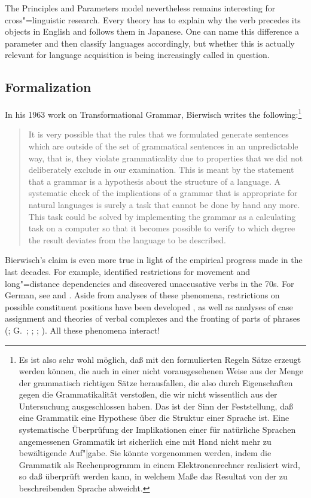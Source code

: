 The Principles and Parameters model nevertheless remains interesting for cross"=linguistic
research. Every theory has to explain why the verb precedes its objects in English and follows them in 
Japanese. One can name this difference a parameter and then classify languages
accordingly, but whether this is actually relevant for language acquisition is being increasingly called in question.

\subsection{Formalization}
\label{sec-formalization-gb}

In his 1963 work on Transformational Grammar, Bierwisch writes the following:\footnote{
Es ist also sehr wohl möglich, daß mit den formulierten Regeln Sätze erzeugt werden können,
die auch in einer nicht vorausgesehenen Weise aus der Menge der grammatisch richtigen Sätze herausfallen,
die also durch Eigenschaften gegen die Grammatikalität verstoßen, die wir nicht wissentlich aus
der Untersuchung ausgeschlossen haben. Das ist der Sinn der Feststellung, daß eine Grammatik
eine Hypothese über die Struktur einer Sprache ist. Eine systematische Überprüfung der Implikationen
einer für natürliche Sprachen angemessenen Grammatik ist sicherlich eine mit Hand nicht mehr
zu bewältigende Auf"|gabe. Sie könnte vorgenommen werden, indem die Grammatik als Rechenprogramm in einem
Elektronenrechner realisiert wird, so daß überprüft werden kann, in welchem Maße das Resultat
von der zu beschreibenden Sprache abweicht.}
\begin{quote}
It is very possible that the rules that we formulated generate
sentences which are outside of the set of grammatical sentences in an
unpredictable way, that is, they violate grammaticality due to
properties that we did not deliberately exclude in our examination. This
is meant by the statement that a grammar is a hypothesis about the
structure of a language. A systematic check of the implications of a
grammar that is appropriate for natural languages is surely a task that
cannot be done by hand any more. This task could be solved by
implementing the grammar as a calculating task on a computer so that it
becomes possible to verify to which degree the result deviates from the
language to be described. \citep*[]{Bierwisch63}
\end{quote}
Bierwisch's claim is even more true in light of the empirical progress made in the last decades. For example,
\citet{Ross67} identified restrictions for movement and long"=distance dependencies and \citet{Perlmutter78} discovered
unaccusative verbs in the 70s. For German, see  and .
Aside from analyses of these phenomena, restrictions on possible constituent positions have been developed
\citep{Lenerz77}, as well as analyses of case assignment \citep*{YMJ87,Meurers99b,Prze99} and theories of
verbal complexes and the fronting of parts of phrases  (\citealp{Evers75a,Grewendorf88a,HN94a,Kiss95a}; G.\ \citealp{GMueller98a};
\citealp{Meurers99c}; \citealp{Mueller99a,Mueller2002b}; \citealp{deKuthy2002a}). All these
phenomena interact!

